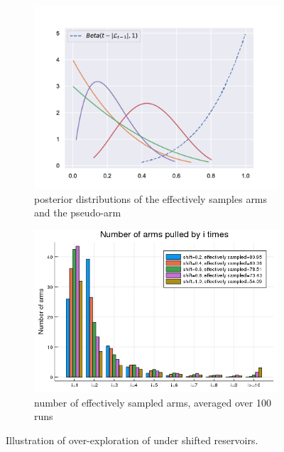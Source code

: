 \begin{figure}[ht]
  \centering
  \begin{subfigure}[ht]{0.45\textwidth}
    \centering\includegraphics[width=\textwidth]{Chapter6/img/shift/order_trick.png}
    \caption{posterior distributions of the effectively samples arms and the pseudo-arm}
    \label{fig:shifted_reservoir}
  \end{subfigure}%
  \hspace{0.5cm}
  \begin{subfigure}[ht]{0.45\textwidth}
    \centering\includegraphics[width=\textwidth]{Chapter6/img/infinite/pulls_shift.png}
    \caption{number of effectively sampled arms, averaged over 100 runs}
    \label{fig:arms_shift}
  \end{subfigure}%
  \caption{Illustration of over-exploration of \DTTTS under shifted reservoirs.}
  \label{fig:arms}
\end{figure}

